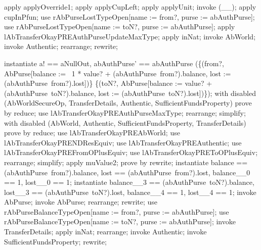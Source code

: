 \begin{LPScript}\begin{zproof}[lAbTransferOkayPREToOPlusEquiv]
    apply applyOverride1;
    apply applyCupLeft;
    apply applyUnit;
    invoke (\_\rel \_);
    apply cupInPfun;
    use rAbPurseLostTypeOpen[name := from?, purse := abAuthPurse];
    use rAbPurseLostTypeOpen[name := toN?, purse := abAuthPurse];
    apply lAbTransferOkayPREAuthPurseUpdateMaxType;
    apply inNat;
    invoke AbWorld;
    invoke Authentic;
    rearrange;
    rewrite;
\end{zproof}\end{LPScript}

\begin{LPScript}\begin{zproof}[tAbTransferOkayTDPRE]
    instantiate a! == aNullOut, abAuthPurse' == abAuthPurse
       \oplus (\{(from?, \theta AbPurse[balance := \negate~1 * value? +
        (abAuthPurse~from?).balance,
        lost := (abAuthPurse~from?).lost])\}
       \cup \{(toN?, \theta AbPurse[balance := value? +
        (abAuthPurse~toN?).balance,
        lost := (abAuthPurse~toN?).lost])\});
    with disabled (AbWorldSecureOp, TransferDetails, Authentic,
        SufficientFundsProperty) prove by reduce;
    use lAbTransferOkayPREAuthPurseMaxType;
    rearrange;
    simplify;
    with disabled (AbWorld, Authentic, SufficientFundsProperty,
        TransferDetails) prove by reduce;
    use lAbTransferOkayPREAbWorld;
    use lAbTransferOkayPRENDResEquiv;
    use lAbTransferOkayPREAuthentic;
    use lAbTransferOkayPREFromOPlusEquiv;
    use lAbTransferOkayPREToOPlusEquiv;
    rearrange;
    simplify;
    apply muValue2;
    prove by rewrite;
    instantiate balance == (abAuthPurse~from?).balance,
        lost == (abAuthPurse~from?).lost,
        balance\_\_0 == 1, lost\_\_0 == 1;
    instantiate balance\_\_3 == (abAuthPurse~toN?).balance,
        lost\_\_3 == (abAuthPurse~toN?).lost,
        balance\_\_4 == 1, lost\_\_4 == 1;
    invoke \Delta AbPurse;
    invoke AbPurse;
    rearrange;
    rewrite;
    use rAbPurseBalanceTypeOpen[name := from?, purse := abAuthPurse];
    use rAbPurseBalanceTypeOpen[name := toN?, purse := abAuthPurse];
    invoke TransferDetails;
    apply inNat;
    rearrange;
    invoke Authentic;
    invoke SufficientFundsProperty;
    rewrite;
\end{zproof}\end{LPScript}

